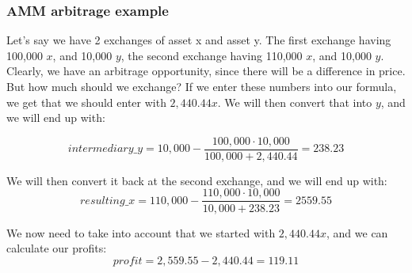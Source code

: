 \subsubsection{AMM arbitrage example}
Let's say we have 2 exchanges of asset x and asset y. The first exchange having
100,000 $x$, and 10,000 $y$, the second exchange having 110,000 $x$, and 10,000 $y$.
Clearly, we have an arbitrage opportunity, since there will be a difference in
price. But how much should we exchange? If we enter these numbers into our
formula, we get that we should enter with $2,440.44 x$. We will then convert that
into $y$, and we will end up with:

\begin{equation}
intermediary\_y = 10,000 - \frac{100,000 \cdot 10,000}{100,000 + 2,440.44} = 238.23
\end{equation}

We will then convert it back at the second exchange, and we will end up with:
\begin{equation}
resulting\_x = 110,000 - \frac{110,000 \cdot 10,000}{10,000 + 238.23} = 2559.55
\end{equation}

We now need to take into account that we started with $2,440.44 x$, and we can
calculate our profits:
\begin{equation}
profit = 2,559.55 - 2,440.44 = 119.11
\end{equation}

